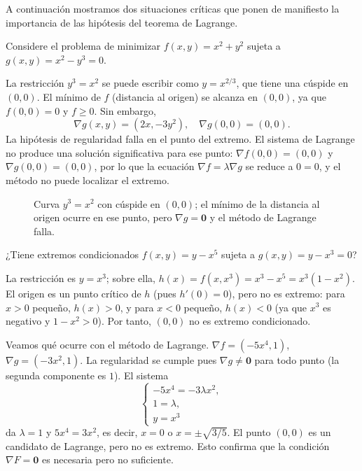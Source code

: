 A continuación mostramos dos situaciones críticas que ponen de manifiesto la importancia de las hipótesis del teorema de Lagrange.


\begin{example}[Cúspide]
Considere el problema de minimizar $f(x,y)=x^2+y^2$ sujeta a $g(x,y)=x^2-y^3=0$.
\end{example}

La restricción $y^3=x^2$ se puede escribir como $y=x^{2/3}$, que tiene una cúspide en $(0,0)$. El mínimo de $f$ (distancia al origen) se alcanza en $(0,0)$, ya que $f(0,0)=0$ y $f\ge0$. Sin embargo,
\[
\nabla g(x,y)=(2x,-3y^2),\quad \nabla g(0,0)=(0,0).
\]
La hipótesis de regularidad falla en el punto del extremo. El sistema de Lagrange no produce una solución significativa para ese punto: $\nabla f(0,0)=(0,0)$ y $\nabla g(0,0)=(0,0)$, por lo que la ecuación $\nabla f=\lambda\nabla g$ se reduce a $0=0$, y el método no puede localizar el extremo.

\begin{figure}[!htbp]
\centering
{}
\caption{Curva $y^3=x^2$ con cúspide en $(0,0)$; el mínimo de la distancia al origen ocurre en ese punto, pero $\nabla g=\mathbf{0}$ y el método de Lagrange falla.}
\label{fig:cuspide_lagrange_falla}
\end{figure}


\begin{example}
¿Tiene extremos condicionados $f(x,y)=y-x^5$ sujeta a $g(x,y)=y-x^3=0$?
\end{example}

La restricción es $y=x^3$; sobre ella, $h(x)=f(x,x^3)=x^3-x^5=x^3(1-x^2)$. El origen es un punto crítico de $h$ (pues $h'(0)=0$), pero no es extremo: para $x>0$ pequeño, $h(x)>0$, y para $x<0$ pequeño, $h(x)<0$ (ya que $x^3$ es negativo y $1-x^2>0$). Por tanto, $(0,0)$ no es extremo condicionado.

Veamos qué ocurre con el método de Lagrange. $\nabla f=(-5x^4,1)$, $\nabla g=(-3x^2,1)$. La regularidad se cumple pues $\nabla g\neq\mathbf{0}$ para todo punto (la segunda componente es $1$). El sistema
\[
\begin{cases}
-5x^4 = -3\lambda x^2,\\
1 = \lambda,\\
y=x^3
\end{cases}
\]
da $\lambda=1$ y $5x^4=3x^2$, es decir, $x=0$ o $x=\pm\sqrt{3/5}$. El punto $(0,0)$ es un candidato de Lagrange, pero no es extremo. Esto confirma que la condición $\nabla F=\mathbf{0}$ es necesaria pero no suficiente.

